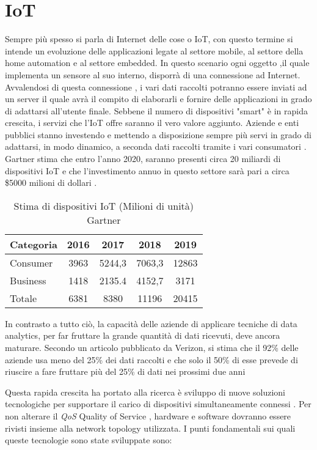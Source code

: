 \chapter{IoT}
Sempre più spesso si parla di Internet delle cose o IoT, con questo termine si
intende un evoluzione delle applicazioni legate al settore mobile, al settore
della home automation e al settore embedded.  In questo scenario ogni oggetto
,il quale implementa un sensore al suo interno, disporrà di una connessione ad
Internet.  Avvalendosi di questa connessione , i vari dati raccolti potranno
essere inviati ad un server il quale avrà il compito di elaborarli e fornire
delle applicazioni in grado di adattarsi all'utente finale.  Sebbene il numero
di dispositivi "smart" è in rapida crescita, i servizi che l'IoT offre saranno
il vero valore aggiunto. Aziende e enti pubblici stanno investendo e mettendo a
disposizione sempre più servi in grado di adattarsi, in modo dinamico, a seconda
dati raccolti tramite i vari consumatori . Gartner stima che entro l'anno 2020,
saranno presenti circa 20 miliardi di dispositivi IoT  e  che l'investimento
annuo  in questo settore sarà pari a circa \$5000 milioni di dollari
\cite{gartner2016}. 

\begin{table}[h]
        \centering
        \begin{tabular}{l|c|c|c|c}
                Categoria  & 2016 & 2017 & 2018 & 2019 \\
                \hline
                Consumer  & 3963 & 5244,3 & 7063,3 & 12863 \\
                Business  & 1418 & 2135.4 & 4152,7 & 3171  \\
                Totale    & 6381 & 8380   & 11196  & 20415 \\
        \end{tabular}
        \caption{Stima di dispositivi IoT (Milioni di unità) Gartner\cite{gartner2016}}
\end{table}

In contrasto a tutto ciò, la capacità delle aziende di applicare tecniche di
data analytics, per far fruttare la grande quantità di dati ricevuti, deve ancora
maturare. Secondo un articolo pubblicato da Verizon, si stima che il 92\% delle
aziende usa meno del 25\% dei dati raccolti e che solo il 50\% di esse prevede
di riuscire a fare fruttare più del 25\% di dati nei prossimi due anni \cite{VerizionIoT}


Questa rapida crescita ha portato alla ricerca è sviluppo
di nuove soluzioni tecnologiche per supportare il carico di dispositivi
simultaneamente connessi . Per non alterare il \emph{QoS} Quality of Service ,
hardware e software dovranno essere rivisti insieme alla network topology utilizzata. 
I punti fondamentali sui quali queste tecnologie sono state sviluppate sono: 

